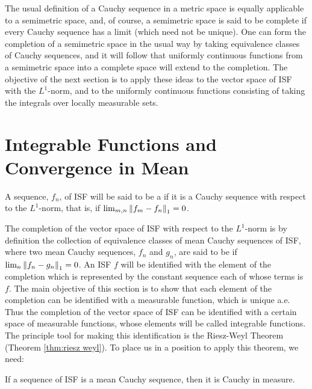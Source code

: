 The usual definition of a Cauchy sequence in a metric space is equally applicable to a semimetric space, and, of course, a semimetric space is said to be complete if every Cauchy sequence has a limit (which need not be unique). One can form the completion of a semimetric space in the usual way by taking equivalence classes of Cauchy sequences, and it will follow that uniformly continuous functions from a semimetric space into a complete space will extend to the completion. The objective of the next section is to apply these ideas to the vector space of ISF with the $L^1$-norm, and to the uniformly continuous functions consisting of taking the integrals over locally measurable sets.

\section{Integrable Functions and Convergence in Mean}

\begin{definition}
A sequence, $f_n$, of ISF will be said to be a  if it is a Cauchy sequence with respect to the $L^1$-norm, that is, if $\lim_{m, n}\norm{f_m-f_n}_1=0$.
\end{definition}

The completion of the vector space of ISF with respect to the $L^1$-norm is by definition the collection of equivalence classes of mean Cauchy sequences of ISF, where two mean Cauchy sequences, $f_n$ and $g_n$, are said to be  if $\lim_n\norm{f_n-g_n}_1=0$. An ISF $f$ will be identified with the element of the completion which is represented by the constant sequence each of whose terms is $f$. The main objective of this section is to show that each element of the completion can be identified with a measurable function, which is unique a.e. Thus the completion of the vector space of ISF can be identified with a certain space of measurable functions, whose elements will be called integrable functions. The principle tool for making this identification is the Riesz-Weyl Theorem (Theorem \ref{thm:riesz weyl}). To place us in a position to apply this theorem, we need:

\begin{lemma}\label{lem:ISF mean cauchy implies cauchy in measure}
If a sequence of ISF is a mean Cauchy sequence, then it is Cauchy in measure.
\end{lemma}

